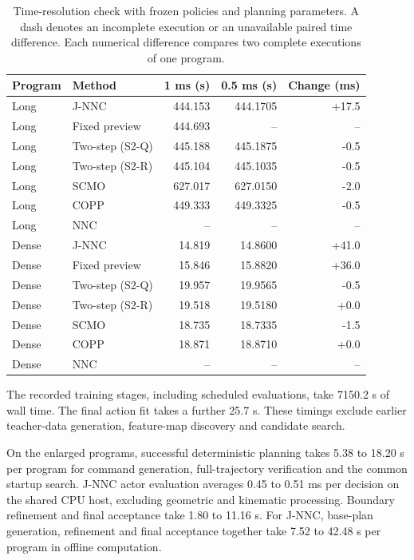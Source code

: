 \documentclass[preprint,12pt]{elsarticle}
\begin{document}
\begin{table}[htbp]
\centering
\caption{Time-resolution check with frozen policies and planning parameters. A dash denotes an incomplete execution or an unavailable paired time difference. Each numerical difference compares two complete executions of one program.}
\label{tab:resolution}
\small
\begin{tabular}{llrrr}
\toprule
Program & Method & 1 ms (s) & 0.5 ms (s) & Change (ms) \\
\midrule
Long & J-NNC & 444.153 & 444.1705 & +17.5 \\
Long & Fixed preview & 444.693 & -- & -- \\
Long & Two-step (S2-Q) & 445.188 & 445.1875 & -0.5 \\
Long & Two-step (S2-R) & 445.104 & 445.1035 & -0.5 \\
Long & SCMO & 627.017 & 627.0150 & -2.0 \\
Long & COPP & 449.333 & 449.3325 & -0.5 \\
Long & NNC & -- & -- & -- \\
\midrule
Dense & J-NNC & 14.819 & 14.8600 & +41.0 \\
Dense & Fixed preview & 15.846 & 15.8820 & +36.0 \\
Dense & Two-step (S2-Q) & 19.957 & 19.9565 & -0.5 \\
Dense & Two-step (S2-R) & 19.518 & 19.5180 & +0.0 \\
Dense & SCMO & 18.735 & 18.7335 & -1.5 \\
Dense & COPP & 18.871 & 18.8710 & +0.0 \\
Dense & NNC & -- & -- & -- \\
\bottomrule
\end{tabular}
\end{table}

The recorded training stages, including scheduled evaluations, take 7150.2{} s of wall time. The final action fit takes a further 25.7{} s. These timings exclude earlier teacher-data generation, feature-map discovery and candidate search.

On the enlarged programs, successful deterministic planning takes 5.38{} to 18.20{} s per program for command generation, full-trajectory verification and the common startup search. J-NNC actor evaluation averages 0.45{} to 0.51{} ms per decision on the shared CPU host, excluding geometric and kinematic processing. Boundary refinement and final acceptance take 1.80{} to 11.16{} s. For J-NNC, base-plan generation, refinement and final acceptance together take 7.52{} to 42.48{} s per program in offline computation.
\end{document}
